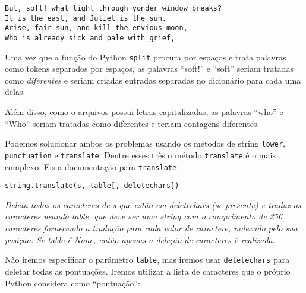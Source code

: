\beforeverb
\begin{verbatim}
But, soft! what light through yonder window breaks?
It is the east, and Juliet is the sun.
Arise, fair sun, and kill the envious moon,
Who is already sick and pale with grief,
\end{verbatim}
\afterverb
%
Uma vez que a função do Python {\tt split} procura por espaços e trata palavras como tokens separados por espaços, as palavras ``soft!'' e ``soft'' seriam tratadas como \emph{diferentes} e seriam criadas entradas separadas no dicionário para cada uma delas.

Além disso, como o arquivos possui letras capitalizadas, as palavras ``who'' e ``Who'' seriam tratadas como diferentes e teriam contagens diferentes.

Podemos solucionar ambos os problemas usando os métodos de string {\tt lower}, {\tt punctuation} e {\tt translate}. Dentre esses três o método {\tt translate} é o mais complexo. Eis a documentação para {\tt translate}:

\verb"string.translate(s, table[, deletechars])"

\emph{Deleta todos os caracteres de s que estão em deletechars (se presente) e traduz os caracteres usando table, que deve ser uma string com o comprimento de 256 caracteres fornecendo a tradução para cada valor de caractere, indexado pelo sua posição. Se table é None, então apenas a deleção de caracteres é realizada.}

Não iremos especificar o parâmetro {\tt table}, mas iremos usar {\tt deletechars} para deletar todas as pontuações. Iremos utilizar a lista de caracteres que o próprio Python considera como ``pontuação'':

